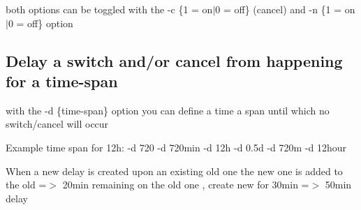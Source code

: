 \begin{DoxyItemize}
\item both options can be toggled with the -\/c \{1 = on$\vert$0 = off\} (cancel) and -\/n \{1 = on$\vert$0 = off\} option
\end{DoxyItemize}\hypertarget{index_delay}{}\subsection{Delay a switch and/or cancel from happening for a time-\/span}\label{index_delay}

\begin{DoxyItemize}
\item with the -\/d \{time-\/span\} option you can define a time a span until which no switch/cancel will occur
\begin{DoxyItemize}
\item Example time span for 12h\+: -\/d 720 -\/d 720min -\/d 12h -\/d 0.\+5d -\/d 720m -\/d 12hour
\item When a new delay is created upon an existing old one the new one is added to the old =$>$ 20min remaining on the old one , create new for 30min =$>$ 50min delay 
\end{DoxyItemize}
\end{DoxyItemize}